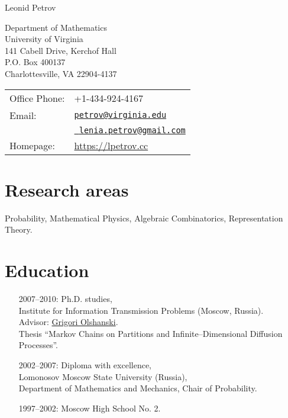 \documentclass[letterpaper,11pt]{article}
\def\name{Leonid Petrov}
\begin{document}
{\huge \name}


\vspace{0.25in}

\begin{minipage}{0.45\linewidth}
	Department of Mathematics\\ University of Virginia\\ 141 Cabell Drive,
	Kerchof Hall\\ P.O. Box 400137\\ Charlottesville, VA 22904-4137
\end{minipage}
\begin{minipage}{0.45\linewidth}
	\begin{tabular}{ll}
		Office Phone: & +1-434-924-4167                           \\
		Email:        &
		\href{mailto:petrov@virginia.edu}{\tt petrov@virginia.edu}\\&
		\href{mailto:lenia.petrov@gmail.com}{\tt
			lenia.petrov@gmail.com}
		\\
		Homepage:     & \url{https://lpetrov.cc} \\
	\end{tabular}
\end{minipage}

\section*{Research areas}

Probability, Mathematical Physics, Algebraic Combinatorics, Representation
Theory.

\section*{Education}

\begin{itemize}
	\item
	      [2007--2010:]
	      Ph.D. studies,\\Institute for Information Transmission Problems
	      (Moscow, Russia). \\ Advisor:
	      \href{http://www.iitp.ru/en/userpages/88/}{Grigori Olshanski}.\\ Thesis
	      ``Markov Chains on Partitions and Infinite--Dimensional Diffusion Processes''.

	\item
	      [2002--2007:]
	      Diploma with excellence,\\ Lomonosov Moscow State University
	      (Russia),\\ Department of Mathematics and Mechanics, Chair of Probability.

	\item
	      [1997--2002:] Moscow High School No. 2.

\end{itemize}
\end{document}
